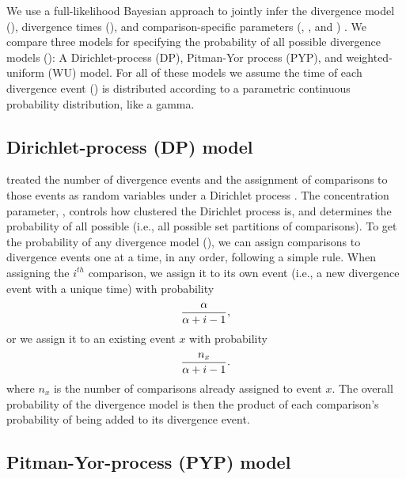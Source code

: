\documentclass[letterpaper,12pt]{article}
\begin{document}
We use a full-likelihood Bayesian approach to jointly infer
the divergence model (\etimesets), divergence times
(\etimes),
and comparison-specific parameters (\epopsize, \murate, and \gfreq)
\citep{Oaks2018ecoevolity,Oaks2019codemog}.
We compare three models for specifying the probability of all
possible divergence models (\etimesets):
A Dirichlet-process (DP), Pitman-Yor process (PYP), and
weighted-uniform (WU) model.
For all of these models we assume the time of each divergence event (\etime) is
distributed according to a parametric continuous probability distribution, like
a gamma.

\subsection{Dirichlet-process (DP) model}

\begin{linenomath}
\citet{Oaks2018ecoevolity} treated the number of divergence events and the
assignment of comparisons to those events as random variables under a Dirichlet
process \citep{Ferguson1973, Antoniak1974}.
The concentration parameter, \concentration, controls how clustered the
Dirichlet process is, and determines the probability of all possible \etimesets
(i.e., all possible set partitions of \ncomparisons comparisons).
To get the probability of any divergence model (\etimesets), we can assign
comparisons to divergence events one at a time, in any order, following a
simple rule.
When assigning the $i^{th}$ comparison, we assign it to its own event
(i.e., a new divergence event with a unique time) with probability
\begin{equation}
    \frac{\alpha}{\alpha + i - 1},
    \label{eq:dpnewcat}
\end{equation}
or we assign it to an existing event $x$ with probability
\begin{equation}
    \frac{n_x}{\alpha + i - 1}.
    \label{eq:dpexistingcat}
\end{equation}
where $n_x$ is the number of comparisons already assigned to event $x$.
The overall probability of the divergence model is then the product of each
comparison's probability of being added to its divergence event.
\end{linenomath}

\subsection{Pitman-Yor-process (PYP) model}
\end{document}
